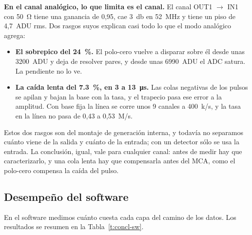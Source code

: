 \textbf{En el canal analógico, lo que limita es el canal.} El canal
OUT1 $\rightarrow$ IN1 con \qty{50}{\ohm} tiene una ganancia de 0,95, cae
\qty{3}{\decibel} en \qty{52}{\mega\hertz} y tiene un piso de 4,7~ADU rms. Dos
rasgos suyos explican casi todo lo que el modo analógico agrega:
\begin{itemize}
  \item \textbf{El sobrepico del \qty{24}{\percent}.} El polo-cero vuelve a
    disparar sobre él desde unas 3200~ADU y deja de resolver pares, y desde unas
    6990~ADU el ADC satura. La pendiente no lo ve.
  \item \textbf{La caída lenta del \qty{7.3}{\percent}, en 3 a
    \qty{13}{\micro\second}.} Las colas negativas de los pulsos se apilan y
    bajan la base con la tasa, y el trapecio pasa ese error a la amplitud. Con
    base fija la línea se corre unos 9 canales a 400~k/s, y la tasa en la línea
    no pasa de 0,43 a 0,53~M/s.
\end{itemize}

Estos dos rasgos son del montaje de generación interna, y todavía no separamos
cuánto viene de la salida y cuánto de la entrada; con un detector sólo se usa la
entrada. La conclusión, igual, vale para cualquier canal: antes de medir hay que
caracterizarlo, y una cola lenta hay que compensarla antes del MCA, como el
polo-cero compensa la caída del pulso.

\subsection{Desempeño del software}
\label{S:concl-sw}

En el software medimos cuánto cuesta cada capa del camino de los datos. Los
resultados se resumen en la Tabla~\ref{t:concl-sw}.

